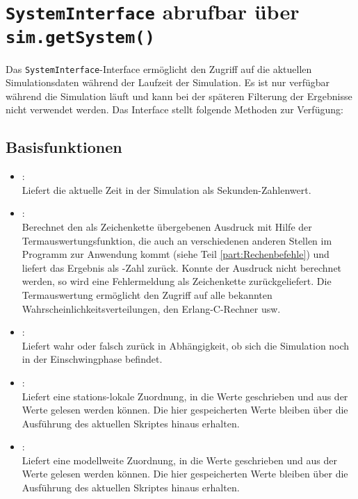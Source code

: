 \chapter{\texttt{SystemInterface} abrufbar über \texttt{sim.getSystem()}}

Das \texttt{SystemInterface}-Interface ermöglicht den Zugriff auf die aktuellen Simulationsdaten während
der Laufzeit der Simulation. Es ist nur verfügbar während die Simulation läuft und kann bei der
späteren Filterung der Ergebnisse nicht verwendet werden. Das Interface stellt folgende Methoden zur Verfügung:

\section{Basisfunktionen}

\begin{itemize}

\item
{}:\\
Liefert die aktuelle Zeit in der Simulation als Sekunden-Zahlenwert.

\item
{}:\\
Berechnet den als Zeichenkette übergebenen Ausdruck mit Hilfe der Termauswertungsfunktion, die
auch an verschiedenen anderen Stellen im Programm zur Anwendung kommt (siehe Teil \ref{part:Rechenbefehle}) und liefert das Ergebnis
als -Zahl zurück. Konnte der Ausdruck nicht berechnet werden, so wird eine Fehlermeldung als
Zeichenkette zurückgeliefert. Die Termauswertung ermöglicht den Zugriff auf alle bekannten
Wahrscheinlichkeitsverteilungen, den Erlang-C-Rechner usw.
  
\item
{}:\\
Liefert wahr oder falsch zurück in Abhängigkeit, ob sich die Simulation noch in der Einschwingphase befindet.

\item
{}:\\
Liefert eine stations-lokale Zuordnung, in die Werte geschrieben und aus der Werte gelesen werden können.
Die hier gespeicherten Werte bleiben über die Ausführung des aktuellen Skriptes hinaus erhalten.

\item
{}:\\
Liefert eine modellweite Zuordnung, in die Werte geschrieben und aus der Werte gelesen werden können.
Die hier gespeicherten Werte bleiben über die Ausführung des aktuellen Skriptes hinaus erhalten.


\end{itemize}
